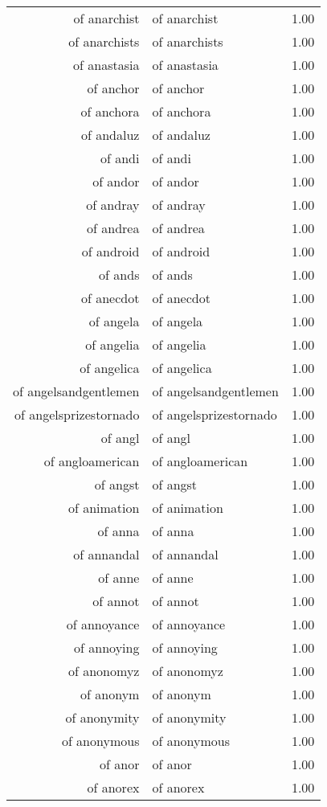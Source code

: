 \begin{table}[ht]
\begin{tabular}{rlr}
  of anarchist & of anarchist & 1.00 \\ 
  of anarchists & of anarchists & 1.00 \\ 
  of anastasia & of anastasia & 1.00 \\ 
  of anchor & of anchor & 1.00 \\ 
  of anchora & of anchora & 1.00 \\ 
  of andaluz & of andaluz & 1.00 \\ 
  of andi & of andi & 1.00 \\ 
  of andor & of andor & 1.00 \\ 
  of andray & of andray & 1.00 \\ 
  of andrea & of andrea & 1.00 \\ 
  of android & of android & 1.00 \\ 
  of ands & of ands & 1.00 \\ 
  of anecdot & of anecdot & 1.00 \\ 
  of angela & of angela & 1.00 \\ 
  of angelia & of angelia & 1.00 \\ 
  of angelica & of angelica & 1.00 \\ 
  of angelsandgentlemen & of angelsandgentlemen & 1.00 \\ 
  of angelsprizestornado & of angelsprizestornado & 1.00 \\ 
  of angl & of angl & 1.00 \\ 
  of angloamerican & of angloamerican & 1.00 \\ 
  of angst & of angst & 1.00 \\ 
  of animation & of animation & 1.00 \\ 
  of anna & of anna & 1.00 \\ 
  of annandal & of annandal & 1.00 \\ 
  of anne & of anne & 1.00 \\ 
  of annot & of annot & 1.00 \\ 
  of annoyance & of annoyance & 1.00 \\ 
  of annoying & of annoying & 1.00 \\ 
  of anonomyz & of anonomyz & 1.00 \\ 
  of anonym & of anonym & 1.00 \\ 
  of anonymity & of anonymity & 1.00 \\ 
  of anonymous & of anonymous & 1.00 \\ 
  of anor & of anor & 1.00 \\ 
  of anorex & of anorex & 1.00 \\ 

\end{tabular}
\end{table}
